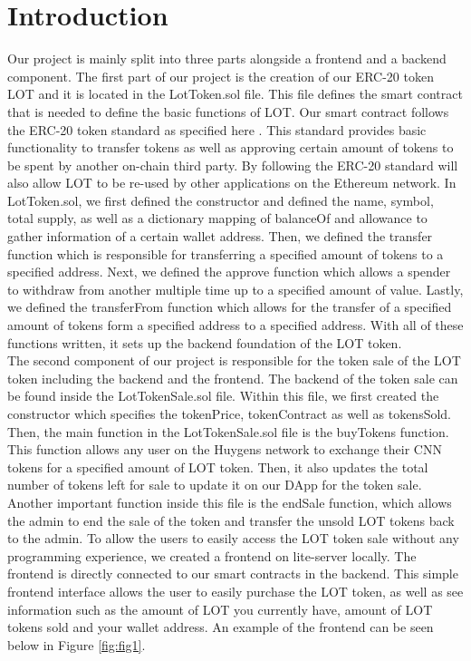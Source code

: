 \documentclass[11pt]{article}
\newcommand {\rfig}[1]{Figure \ref{fig:#1}}
\begin{document}
\section*{Introduction}
Our project is mainly split into three parts alongside a frontend and a backend component. The first part of our project is the creation of our ERC-20 token LOT and it is located in the LotToken.sol file. This file defines the smart contract that is needed to define the basic functions of LOT. Our smart contract follows the ERC-20 token standard as specified here \parencite{WEBSITE:1}. This standard provides basic functionality to transfer tokens as well as approving certain amount of tokens to be spent by another on-chain third party. By following the ERC-20 standard will also allow LOT to be re-used by other applications on the Ethereum network. In LotToken.sol, we first defined the constructor and defined the name, symbol, total supply, as well as a dictionary mapping of balanceOf and allowance to gather information of a certain wallet address. Then, we defined the transfer function which is responsible for transferring a specified amount of tokens to a specified address. Next, we defined the approve function which allows a spender to withdraw from another multiple time up to a specified amount of value. Lastly, we defined the transferFrom function which allows for the transfer of a specified amount of tokens form a specified address to a specified address. With all of these functions written, it sets up the backend foundation of the LOT token. \\
The second component of our project is responsible for the token sale of the LOT token including the backend and the frontend. The backend of the token sale can be found inside the LotTokenSale.sol file. Within this file, we first created the constructor which specifies the tokenPrice, tokenContract as well as tokensSold. Then, the main function in the LotTokenSale.sol file is the buyTokens function. This function allows any user on the Huygens network to exchange their CNN tokens for a specified amount of LOT token. Then, it also updates the total number of tokens left for sale to update it on our DApp for the token sale. Another important function inside this file is the endSale function, which allows the admin to end the sale of the token and transfer the unsold LOT tokens back to the admin. To allow the users to easily access the LOT token sale without any programming experience, we created a frontend on lite-server locally. The frontend is directly connected to our smart contracts in the backend. This simple frontend interface allows the user to easily purchase the LOT token, as well as see information such as the amount of LOT you currently have, amount of LOT tokens sold and your wallet address. An example of the frontend can be seen below in \rfig{fig1}.\\
\end{document}
